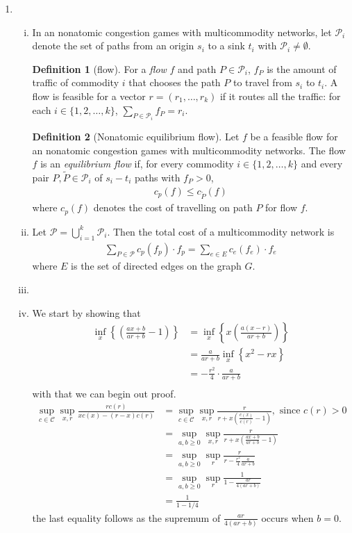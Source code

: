 \documentclass[a4paper,12pt]{article}
\theoremstyle{definition}
\newtheorem*{defn}{Definition}
\begin{document}
\begin{enumerate}
\item 
\begin{enumerate}[(i)]
\item In an nonatomic congestion games with multicommodity networks, let $\mathcal{P}_i$ denote the set of paths from an origin $s_i$ to a sink $t_i$ with $\mathcal{P}_i\neq \emptyset$.
\begin{defn}[flow]
For a \emph{flow} $f$ and path $P \in \mathcal{P}_i$, $f_P$ is the amount of traffic of commodity $i$ that chooses the path $P$ to travel from $s_i$ to $t_i$. A flow is feasible for a vector $r=(r_1,\ldots,r_k)$ if it routes all the traffic: for each $i\in \{1, 2, \ldots, k\}$, $\sum_{P\in \mathcal{P}_i}f_P=r_i$.
\end{defn}
\begin{defn}[Nonatomic equilibrium flow]
Let $f$ be a feasible flow for an nonatomic congestion games with multicommodity networks. The flow $f$ is an \emph{equilibrium flow} if, for every commodity $i \in \{1,2, \ldots, k\}$ and every pair $P, \tilde{P} \in \mathcal{P}_i$ of $s_i-t_i$ paths with $f_P>0$, 
\begin{align*}
c_p(f) \leq c_{\tilde{P}}(f)
\end{align*}
where $c_p(f)$ denotes the cost of travelling on path $P$ for flow $f$.
\end{defn}
\item Let $\mathcal{P}=\bigcup_{i=1}^{k}\mathcal{P}_i$. Then the total cost of a multicommodity network is 
\begin{align*}
\sum_{P\in \mathcal{P}}c_p(f_p)\cdot f_p = \sum_{e\in E}c_e(f_e)\cdot f_e
\end{align*}
where $E$ is the set of directed edges on the graph $G$.
\item
\item We start by showing that 
\begin{align*}
\inf_{x}\left\{\left(\frac{ax+b}{ar+b}-1\right)\right\}&=\inf_{x}\left\{x\left(\frac{a(x-r)}{ar+b}\right)\right\}\\
&=\frac{a}{ar+b}\inf_{x}\left\{x^2-rx\right\}\\
&=-\frac{r^2}{4}\cdot\frac{a}{ar+b}\\
\end{align*}
with that we can begin out proof.
\begin{align*}
\sup_{c\in \mathcal{C}}\sup_{x,r}\frac{rc(r)}{x c(x)-(r-x)c(r)}&=\sup_{c\in \mathcal{C}}\sup_{x,r}\frac{r}{r +x\left(\frac{c(x)}{c(r)}-1\right)}, \text{ since $c(r)>0$}
\\
&=\sup_{a,b\geq0}\sup_{x,r}\frac{r}{r +x\left(\frac{ax+b}{ar+b}-1\right)}\\
&=\sup_{a,b\geq0}\sup_{r}\frac{r}{r -\frac{r^2}{4}\frac{a}{ar+b}}\\
&=\sup_{a,b\geq0}\sup_{r}\frac{1}{1 -\frac{ar}{4(ar+b)}}\\
&=\frac{1}{1-1/4}
\end{align*}
the last equality follows as the supremum of $\frac{ar}{4(ar+b)}$ occurs when $b=0$.
\end{enumerate}


\end{enumerate}
\end{document}
